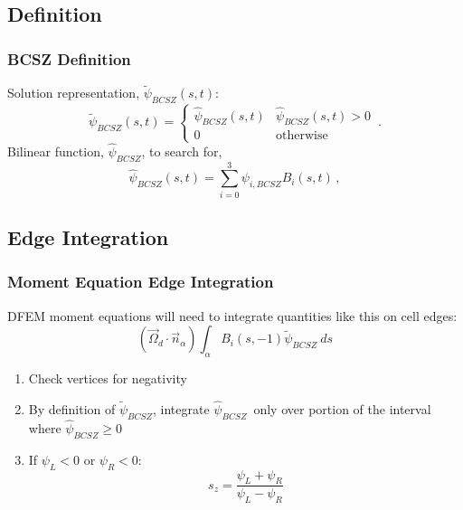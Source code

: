 \documentclass{beamer}
\newcommand{\be}{\begin{equation*}}   %
\newcommand{\ee}{\end{equation*}}
\newcommand{\benum}{\begin{equation}}   %
\newcommand{\eenum}{\end{equation}}
\newcommand{\B}[1]{\ensuremath{B_{#1} }}			%
\newcommand{\omg}{\ensuremath{\vec{\Omega}}}
\newcommand{\BCSZ}{\ensuremath{\widetilde{\psi}_{BCSZ}}}
\newcommand{\BCSZH}{\ensuremath{\widehat{\psi}_{BCSZ}}}
\newcommand{\pec}{\, ,}
\newcommand{\pep}{\, .}
\begin{document}
\subsection{Definition}

\begin{frame}
\frametitle{BCSZ Definition}
Solution representation, $\widetilde{\psi}_{BCSZ}(s,t)$:
\benum
\BCSZ(s,t) = \left \{ \begin{array}{ll}
\BCSZH(s,t) & \BCSZH(s,t) > 0 \\
0	& \text{otherwise}
\end{array}
\right. \pep
\label{eq:bcsz}
\eenum
Bilinear function, $\widehat{\psi}_{BCSZ}$, to search for,
\benum
\BCSZH(s,t) = \sum_{i=0}^3{\psi_{i,BCSZ} \B{i}(s,t)} \pec
\eenum

\end{frame}

\subsection{Edge Integration}
\begin{frame}
\frametitle{Moment Equation Edge Integration}
DFEM moment equations will need to integrate quantities like this on cell edges:
\be
(\omg_d \cdot \vec{n}_{\alpha}) \int_{\alpha}{\B{i}(s,-1) \BCSZ~ds}
\ee
\begin{enumerate}
\item Check vertices for negativity
\item By definition of \BCSZ, integrate \BCSZH ~only over portion of the interval where $\BCSZH\geq 0$
\item If $\psi_L < 0$ or $\psi_R < 0$:
\be
s_z = \frac{\psi_{L}+\psi_{R}}{\psi_{L} - \psi_{R} }
\ee
\end{enumerate}

\end{frame}

\end{document}
